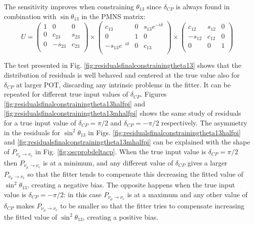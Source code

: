 The sensitivity improves when constraining $\theta_{13}$ since $\delta_{CP}$ is always found in combination with $\sin \theta_{13}$ in the PMNS matrix:
\begin{equation}
U = \left( \begin{array}{ccc} 1 & 0 & 0 \\  0 & c_{23} & s_{23} \\ 0 & -s_{23} & c_{23}\\ \end{array} \right) \times \left( \begin{array}{ccc}  c_{13} & 0 & s_{13}e^{-i\delta} \\ 0 & 1 & 0 \\ - s_{13}e\
\
^{i\delta} & 0 & c_{13}\\ \end{array} \right) \times \left( \begin{array}{ccc}  c_{12} & s_{12} & 0 \\ -s_{12} & c_{12} & 0 \\ 0 & 0 & 1\\ \end{array} \right)
\label{eq:PMNS}
\end{equation}

The test presented in Fig. \ref{fig:residualsfinalconstrainingtheta13} shows that the distribution of residuals is well behaved and centered at the
true value also for $\delta_{CP}$ at larger POT, discarding any intrinsic problems in the fitter. It can be repeated for different true input values of 
$\delta_{CP}$. Figures \ref{fig:residualsfinalconstrainingtheta13halfpi} and \ref{fig:residualsfinalconstrainingtheta13mhalfpi} shows the same study of residuals for a true input value of 
$\delta_{CP} =  \pi/2$ and $\delta_{CP} =  -\pi/2$ respectively. The asymmetry in the residuals  for $\sin^{2}\theta_{13}$ in Figs. \ref{fig:residualsfinalconstrainingtheta13halfpi} and \ref{fig:residualsfinalconstrainingtheta13mhalfpi} can be explained with the shape of $P_{\nu_{\mu}\rightarrow \nu_{e}}$ in Fig. \ref{fig:oscprobdeltacp}. When the true input value is
$\delta_{CP} =  \pi/2$ then $P_{\nu_{\mu}\rightarrow \nu_{e}}$ is at a minimum, and any different value of $\delta_{CP}$ gives a larger $P_{\nu_{\mu}\rightarrow \nu_{e}}$ so that the fitter
tends to compensate this decreasing the fitted value of $\sin^{2}\theta_{13}$, creating a negative bias. The opposite happens when the true input value is
$\delta_{CP} = - \pi/2$: in this case $P_{\nu_{\mu}\rightarrow \nu_{e}}$ is at a maximum and any other value of $\delta_{CP}$ makes $P_{\nu_{\mu}\rightarrow \nu_{e}}$ to be smaller 
so that the fitter tries to compensate increasing the fitted value of $\sin^{2}\theta_{13}$, creating a positive bias.

